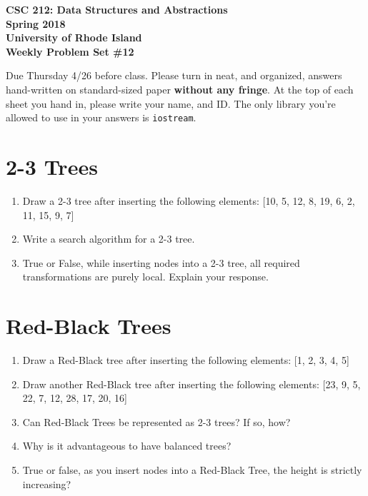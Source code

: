 \documentclass[11pt]{article}
\begin{document}
\thispagestyle{empty}

\begin{center}
    {\Large\bf CSC 212: Data Structures and Abstractions}\\
    \medskip
    {\Large\bf Spring 2018}\\
    \medskip
    {\Large\bf University of Rhode Island}\\
    \bigskip
    {\Large\bf Weekly Problem Set \#12}
\end{center}

Due Thursday 4/26 before class. Please turn in neat, and organized, answers hand-written on standard-sized paper \textbf{without any fringe}. At the top of each sheet you hand in, please write your name, and ID.
The only library you're allowed to use in your answers is \verb|iostream|.

\section{2-3 Trees}
\begin{enumerate}
    \item Draw a 2-3 tree after inserting the following elements: [10, 5, 12, 8, 19, 6, 2, 11, 15, 9, 7]

    \item Write a search algorithm for a 2-3 tree.

    \item True or False, while inserting nodes into a 2-3 tree, all required transformations are purely local. Explain your response.
\end{enumerate}

\section{Red-Black Trees}
\begin{enumerate}
    \item Draw a Red-Black tree after inserting the following elements: [1, 2, 3, 4, 5]
    
    \item Draw another Red-Black tree after inserting the following elements: [23, 9, 5, 22, 7, 12, 28, 17, 20, 16]

    \item Can Red-Black Trees be represented as 2-3 trees? If so, how?

    \item Why is it advantageous to have balanced trees?

    \item True or false, as you insert nodes into a Red-Black Tree, the height is strictly increasing?
\end{enumerate}

\label{r:lastpage}
\end{document}
